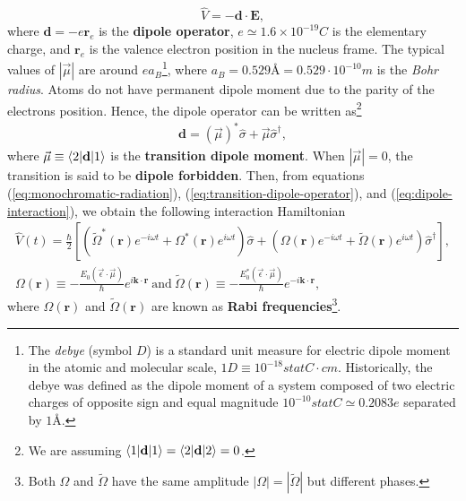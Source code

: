 \begin{equation}
	\hat{V} = - \mathbf{d} \cdot \mathbf{E},
	\label{eq:dipole-interaction}
\end{equation}
where $ \mathbf{d} = - e \mathbf{r}_e  $ is the \textbf{dipole operator}, $ e \simeq 1.6 \times 10^{-19}C $ is the elementary charge, and $ \mathbf{r}_e $ is the valence electron position in the nucleus frame. The typical values of $ |\vec{\mu}| $ are around $ ea_B $\footnote{The \textit{debye} (symbol $ D $) is a standard unit measure for electric dipole moment in the atomic and molecular scale, $ 1 D \equiv 10^{-18} statC \cdot cm $. Historically, the debye was defined as the dipole moment of a system composed of two electric charges of opposite sign and equal magnitude $ 10^{-10} statC \simeq 0.2083 e $ separated by $ 1 \textrm{\AA} $.}, where $ a_B = 0.529 \textrm{\AA} = 0.529 \cdot 10^{-10}m $ is the \textit{Bohr radius}. Atoms do not have permanent dipole moment due to the parity of the electrons position. Hence, the dipole operator can be written as\footnote{We are assuming $ \braket{1|\mathbf{d}|1} = \braket{2|\mathbf{d}|2} = 0 $.}
\begin{gather}
	\mathbf{d} = (\vec{\mu})^* \hat{\sigma} + \vec{\mu} \hat{\sigma}^{\dagger},
	\label{eq:transition-dipole-operator}
\end{gather}
where $ \vec{\mu} \equiv \braket{2|\mathbf{d}|1} $ is the \textbf{transition dipole moment}. When $ |\vec{\mu}| = 0 $, the transition is said to be \textbf{dipole forbidden}. Then, from equations (\ref{eq:monochromatic-radiation}), (\ref{eq:transition-dipole-operator}), and (\ref{eq:dipole-interaction}), we obtain the following interaction Hamiltonian
\begin{gather}
	\hat{V}(t) = \frac{\hbar}{2} [(\tilde{\Omega}^*(\mathbf{r}) e^{- i \omega t} + \Omega^{*}(\mathbf{r})e^{i \omega t})\hat{\sigma} + (\Omega(\mathbf{r}) e^{- i \omega t} + \tilde{\Omega}(\mathbf{r})e^{i \omega t})\hat{\sigma}^{\dagger}],
	\label{eq:full-interaction-Hamiltonian}
	\\
	\Omega(\mathbf{r}) \equiv -\frac{E_0(\vec{\epsilon} \cdot \vec{\mu})}{\hbar}e^{i\mathbf{k}\cdot\mathbf{r}}\ \textrm{and}\ \tilde{\Omega}(\mathbf{r}) \equiv -\frac{E_0^* (\vec{\epsilon} \cdot \vec{\mu})}{\hbar}e^{-i\mathbf{k}\cdot\mathbf{r}},
	\label{eq:Rabi-frequency}
\end{gather}
where $ \Omega(\mathbf{r}) $ and $ \tilde{\Omega}(\mathbf{r}) $ are known as \textbf{Rabi frequencies}\footnote{Both $ \Omega $ and $ \tilde{\Omega} $ have the same amplitude $ |\Omega| = |\tilde{\Omega}| $ but different phases.}.

